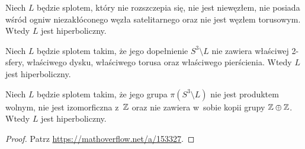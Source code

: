 \begin{proposition}
    Niech $L$ będzie splotem, który nie rozszczepia się, nie jest niewęzłem, nie posiada wśród ogniw niezakłóconego węzła satelitarnego oraz nie jest węzłem torusowym.
    Wtedy $L$ jest hiperboliczny.
\end{proposition}

\begin{proposition}
    Niech $L$ będzie splotem takim, że jego dopełnienie $S^3 \setminus L$ nie zawiera właściwej 2-sfery, właściwego dysku, właściwego torusa oraz właściwego pierścienia.
    Wtedy $L$ jest hiperboliczny.
\end{proposition}

\begin{proposition}
    Niech $L$ będzie splotem takim, że jego grupa $\pi(S^3 \setminus L)$ nie jest produktem wolnym, nie jest izomorficzna z~$\mathbb Z$ oraz nie zawiera w~sobie kopii grupy $\mathbb Z \oplus \mathbb Z$.
    Wtedy $L$ jest hiperboliczny.
\end{proposition}

\begin{proof}
    Patrz \url{https://mathoverflow.net/a/153327}.
\end{proof}

